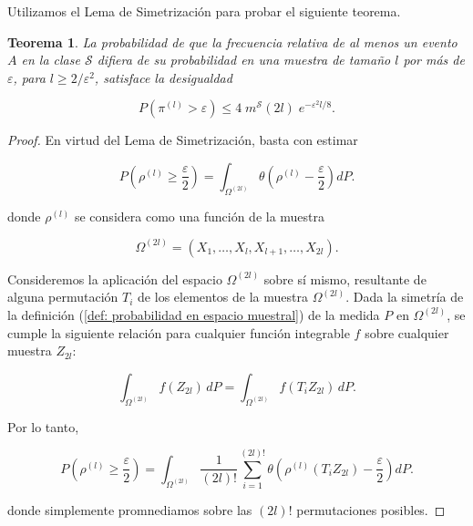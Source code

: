 \documentclass{report}
\newtheorem{thm}{Teorema}[section]
\begin{document}
Utilizamos el Lema de Simetrización para probar el siguiente teorema.\newline

\begin{thm}
    La probabilidad de que la frecuencia relativa de al menos un evento $A$ en la clase \( \mathcal{S} \) difiera de su probabilidad en una 
    muestra de tamaño \( l \) por más de \( \varepsilon \), para \( l \geq 2 / \varepsilon^2 \), satisface la desigualdad  

    \[
    P\left(\pi^{(l)} > \varepsilon\right) \leq 4 \; m^{\mathcal{S}}(2l) \; e^{-\varepsilon^2 l/8}.
    \]  
\end{thm}

\begin{proof}
 
En virtud del Lema de Simetrización, basta con estimar  
    
\[
P\left( \rho^{(l)} \geq \frac{\varepsilon}{2} \right) = \int_{\Omega^{(2l)}} \theta \left( \rho^{(l)} - \frac{\varepsilon}{2} \right) dP.
\]

donde \( \rho^{(l)} \) se considera como una función de la muestra  

\[
\Omega^{(2l)} = (X_1, \dots, X_l, X_{l+1}, \dots, X_{2l}).
\]

Consideremos la aplicación del espacio \( \Omega^{(2l)} \) sobre sí mismo, resultante de alguna permutación \( T_i \) de los elementos de la muestra \( \Omega^{(2l)} \). Dada la simetría 
de la definición (\ref{def: probabilidad en espacio muestral}) de la medida \( P \) en \( \Omega^{(2l)} \), se cumple la siguiente relación para cualquier función integrable \( f \)
sobre cualquier muestra $Z_{2l}$:

\[
\int_{\Omega^{(2l)}} f(Z_{2l}) \, dP = \int_{\Omega^{(2l)}} f(T_i Z_{2l}) \, dP.
\]

Por lo tanto,

\begin{equation}\label{eq:probabilidad integral con permutaciones}
P\left( \rho^{(l)} \geq \frac{\varepsilon}{2} \right) = \int_{\Omega^{(2l)}} \frac{1}{(2l)!} \sum_{i=1}^{(2l)!} \theta \left( \rho^{(l)}(T_i Z_{2l}) - \frac{\varepsilon}{2}  \right) dP.
\end{equation}

donde simplemente promnediamos sobre las \((2l)!\) permutaciones posibles.\newline


\end{proof}
\end{document}
